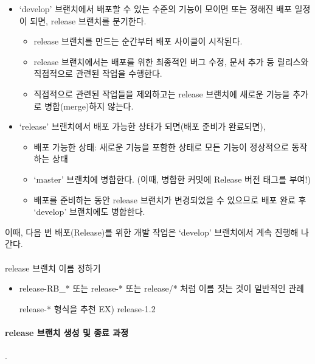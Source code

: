 \documentclass[12pt, a4paper, oneside]{book}
\begin{document}
		\begin{itemize}
\item		‘develop’ 브랜치에서 배포할 수 있는 수준의 기능이 모이면 또는 정해진 배포 일정이 되면, release 브랜치를 분기한다.
			\begin{itemize}
			\item		release 브랜치를 만드는 순간부터 배포 사이클이 시작된다.
			\item		release 브랜치에서는 배포를 위한 최종적인 버그 수정, 문서 추가 등 릴리스와 직접적으로 관련된 작업을 수행한다.
			\item		직접적으로 관련된 작업들을 제외하고는 release 브랜치에 새로운 기능을 추가로 병합(merge)하지 않는다.
			\end{itemize}
\item		‘release’ 브랜치에서 배포 가능한 상태가 되면(배포 준비가 완료되면),
			\begin{itemize}
			\item		배포 가능한 상태: 새로운 기능을 포함한 상태로 모든 기능이 정상적으로 동작 하는 상태
			\item		‘master’ 브랜치에 병합한다. (이때, 병합한 커밋에 Release 버전 태그를 부여!)
			\item		배포를 준비하는 동안 release 브랜치가 변경되었을 수 있으므로 배포 완료 후 ‘develop’ 브랜치에도 병합한다.
			\end{itemize}
			\end{itemize}


			이때, 다음 번 배포(Release)를 위한 개발 작업은 ‘develop’ 브랜치에서 계속 진행해 나간다.
			
			\paragraph{}release 브랜치 이름 정하기

			\begin{itemize}
				\item release-RB\_* 또는 release-* 또는 release/* 처럼 이름 짓는 것이 일반적인 관례
				\item [release-* ] 형식을 추천 EX) release-1.2
			\end{itemize}
			
			
			\paragraph{release 브랜치 생성 및 종료 과정}
.\\
			
\end{document}

